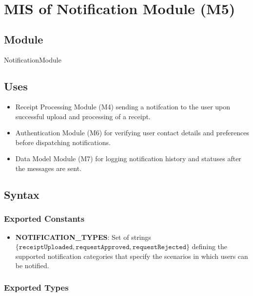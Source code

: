 \documentclass[12pt, titlepage]{article}
\begin{document}
~\newpage

\section{MIS of Notification Module (M5)} \label{ModuleNotification}

\subsection{Module}

NotificationModule

\subsection{Uses}

\begin{itemize}
  \item Receipt Processing Module (M4) sending a notifcation to the user upon successful upload and processing of a receipt.
  \item Authentication Module (M6) for verifying user contact details and preferences before dispatching notifications.
  \item Data Model Module (M7) for logging notification history and statuses after the messages are sent.
\end{itemize}

\subsection{Syntax}

\subsubsection{Exported Constants}

\begin{itemize}
  \item \textbf{NOTIFICATION\_TYPES}: Set of strings $\{\texttt{receiptUploaded}, \texttt{requestApproved}, \texttt{requestRejected}\}$ defining the supported notification categories that specify the scenarios in which users can be notified.
\end{itemize}

\subsubsection{Exported Types}
\end{document}
